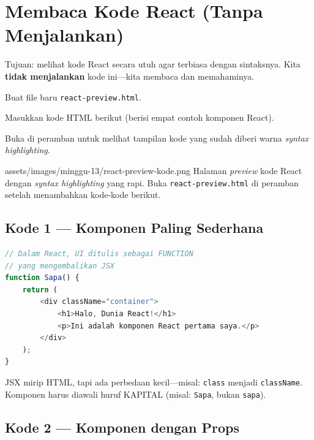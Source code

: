 \section{Membaca Kode React (Tanpa Menjalankan)}
\label{sec:13-membaca-kode}

Tujuan: melihat kode React secara utuh agar terbiasa dengan sintaksnya. Kita \textbf{tidak menjalankan} kode ini---kita membaca dan memahaminya.

\begin{langkah}
  \item Buat file baru \texttt{react-preview.html}.
  \item Masukkan kode HTML berikut (berisi empat contoh komponen React).
  \item Buka di peramban untuk melihat tampilan kode yang sudah diberi warna \emph{syntax highlighting}.
\end{langkah}

\begin{tangkapanlayar}
  {assets/images/minggu-13/react-preview-kode.png}
  {Halaman \emph{preview} kode React dengan \emph{syntax highlighting} yang rapi.}
  {Buka \texttt{react-preview.html} di peramban setelah menambahkan kode-kode berikut.}
\end{tangkapanlayar}

\subsection{Kode 1 --- Komponen Paling Sederhana}

\begin{lstlisting}[language=JavaScript, caption={Komponen ``Halo Dunia'' paling sederhana}, label={lst:13-komponen-sederhana}]
// Dalam React, UI ditulis sebagai FUNCTION
// yang mengembalikan JSX
function Sapa() {
    return (
        <div className="container">
            <h1>Halo, Dunia React!</h1>
            <p>Ini adalah komponen React pertama saya.</p>
        </div>
    );
}
\end{lstlisting}

\begin{catatan}
JSX mirip HTML, tapi ada perbedaan kecil---misal: \texttt{class} menjadi \texttt{className}. Komponen harus diawali huruf KAPITAL (misal: \texttt{Sapa}, bukan \texttt{sapa}).
\end{catatan}

\subsection{Kode 2 --- Komponen dengan Props}

